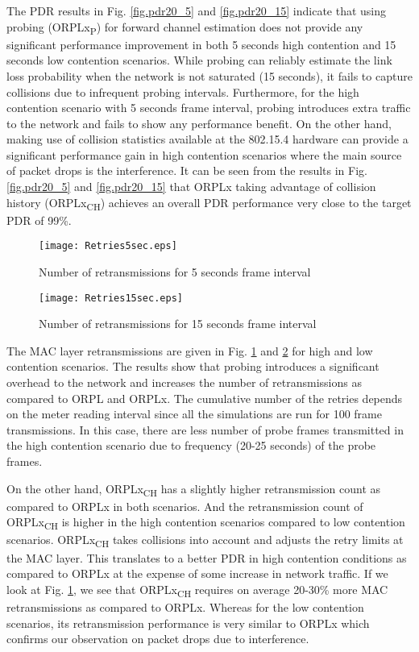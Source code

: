 \documentclass[conference]{IEEEtran}
\begin{document}
The PDR results in Fig. \ref{fig.pdr20_5} and \ref{fig.pdr20_15} indicate that using probing (ORPLx\textsubscript{P}) for forward channel estimation does not provide any significant performance improvement in both 5 seconds high contention and 15 seconds low contention scenarios. While probing can reliably estimate the link loss probability when the network is not saturated (15 seconds), it fails to capture collisions due to infrequent probing intervals. Furthermore, for the high contention scenario with 5 seconds frame interval, probing introduces extra traffic to the network and fails to show any performance benefit. On the other hand, making use of collision statistics available at the 802.15.4 hardware can provide a significant performance gain in high contention scenarios where the main source of packet drops is the interference. It can be seen from the results in Fig. \ref{fig.pdr20_5} and \ref{fig.pdr20_15} that ORPLx taking advantage of collision history (ORPLx\textsubscript{CH}) achieves an overall PDR performance very close to the target PDR of 99\%.


\begin{figure}
 \centering
   \texttt{[image: Retries5sec.eps]}\caption{Number of retransmissions for 5 seconds frame interval}
\label{fig.rexmit5}
\end{figure}

\begin{figure}
 \centering
   \texttt{[image: Retries15sec.eps]}
\caption{Number of retransmissions for 15 seconds frame interval}
\label{fig.rexmit15}
\end{figure}

The MAC layer retransmissions are given in Fig. \ref{fig.rexmit5} and \ref{fig.rexmit15} for high and low contention scenarios. The results show that probing introduces a significant overhead to the network and increases the number of retransmissions as compared to ORPL and ORPLx. The cumulative number of the retries depends on the meter reading interval since all the simulations are run for 100 frame transmissions. In this case, there are less number of probe frames transmitted in the high contention scenario due to frequency (20-25 seconds) of the probe frames. 

On the other hand, ORPLx\textsubscript{CH} has a slightly higher retransmission count as compared to ORPLx in both scenarios. And the retransmission count of ORPLx\textsubscript{CH} is higher in the high contention scenarios compared to low contention scenarios.  ORPLx\textsubscript{CH} takes collisions into account and adjusts the retry limits at the MAC layer. This translates to a better PDR in high contention conditions as compared to ORPLx at the expense of some increase in network traffic. If we look at Fig. \ref{fig.rexmit5}, we see that ORPLx\textsubscript{CH}  requires on average 20-30\% more MAC retransmissions as compared to ORPLx. Whereas for the low contention scenarios, its retransmission performance is very similar to ORPLx which confirms our observation on packet drops due to interference.
\end{document}
